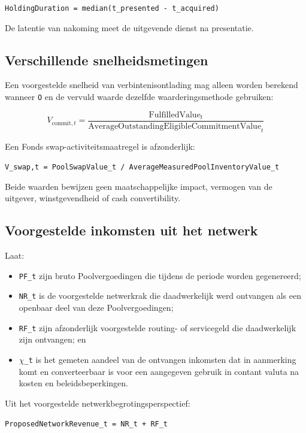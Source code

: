 \documentclass[11pt]{article}
\begin{document}
\texttt{HoldingDuration = median(t\_presented - t\_acquired)}

De latentie van nakoming meet de uitgevende dienst na presentatie.

\subsection*{Verschillende snelheidsmetingen}

Een voorgestelde snelheid van verbintenisontlading mag alleen worden berekend wanneer \texttt{O} en de vervuld waarde dezelfde waarderingsmethode gebruiken:

\[
V_{\mathrm{commit},t} = \frac{\mathrm{FulfilledValue}_t}{\mathrm{AverageOutstandingEligibleCommitmentValue}_t}
\]

Een Fonds swap-activiteitsmaatregel is afzonderlijk:

\texttt{V\_swap,t = PoolSwapValue\_t / AverageMeasuredPoolInventoryValue\_t}

Beide waarden bewijzen geen maatschappelijke impact, vermogen van de uitgever, winstgevendheid of cash convertibility.

\subsection*{Voorgestelde inkomsten uit het netwerk}

Laat:

\begin{itemize}[leftmargin=*]
\item \texttt{PF\_t} zijn bruto Poolvergoedingen die tijdens de periode worden gegenereerd;
\item \texttt{NR\_t} is de voorgestelde netwerkrak die daadwerkelijk werd ontvangen als een openbaar deel van deze Poolvergoedingen;
\item \texttt{RF\_t} zijn afzonderlijk voorgestelde routing- of servicegeld die daadwerkelijk zijn ontvangen; en
\item \texttt{$\chi$\_t} is het gemeten aandeel van de ontvangen inkomsten dat in aanmerking komt en converteerbaar is voor een aangegeven gebruik in contant valuta na kosten en beleidsbeperkingen.
\end{itemize}
Uit het voorgestelde netwerkbegrotingsperspectief:

\texttt{ProposedNetworkRevenue\_t = NR\_t + RF\_t}
\end{document}
